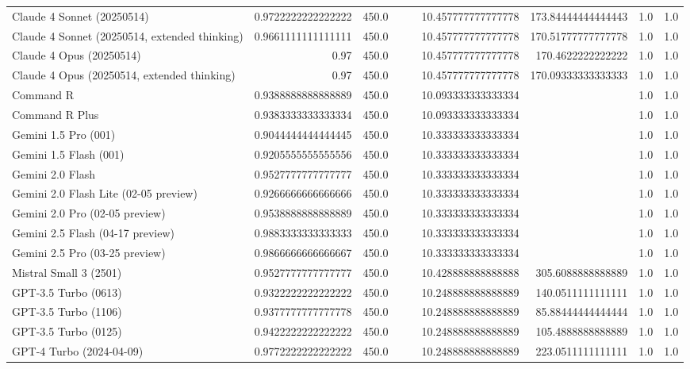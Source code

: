 \begin{table}[htp]
{\begin{tabular}{lrrrrrrrr}
Claude 4 Sonnet (20250514) & 0.9722222222222222 & 450.0 &  &  & 10.457777777777778 & 173.84444444444443 & 1.0 & 1.0 \\
Claude 4 Sonnet (20250514, extended thinking) & 0.9661111111111111 & 450.0 &  &  & 10.457777777777778 & 170.51777777777778 & 1.0 & 1.0 \\
Claude 4 Opus (20250514) & 0.97 & 450.0 &  &  & 10.457777777777778 & 170.4622222222222 & 1.0 & 1.0 \\
Claude 4 Opus (20250514, extended thinking) & 0.97 & 450.0 &  &  & 10.457777777777778 & 170.09333333333333 & 1.0 & 1.0 \\
Command R & 0.9388888888888889 & 450.0 &  &  & 10.093333333333334 &  & 1.0 & 1.0 \\
Command R Plus & 0.9383333333333334 & 450.0 &  &  & 10.093333333333334 &  & 1.0 & 1.0 \\
Gemini 1.5 Pro (001) & 0.9044444444444445 & 450.0 &  &  & 10.333333333333334 &  & 1.0 & 1.0 \\
Gemini 1.5 Flash (001) & 0.9205555555555556 & 450.0 &  &  & 10.333333333333334 &  & 1.0 & 1.0 \\
Gemini 2.0 Flash & 0.9527777777777777 & 450.0 &  &  & 10.333333333333334 &  & 1.0 & 1.0 \\
Gemini 2.0 Flash Lite (02-05 preview) & 0.9266666666666666 & 450.0 &  &  & 10.333333333333334 &  & 1.0 & 1.0 \\
Gemini 2.0 Pro (02-05 preview) & 0.9538888888888889 & 450.0 &  &  & 10.333333333333334 &  & 1.0 & 1.0 \\
Gemini 2.5 Flash (04-17 preview) & 0.9883333333333333 & 450.0 &  &  & 10.333333333333334 &  & 1.0 & 1.0 \\
Gemini 2.5 Pro (03-25 preview) & 0.9866666666666667 & 450.0 &  &  & 10.333333333333334 &  & 1.0 & 1.0 \\
Mistral Small 3 (2501) & 0.9527777777777777 & 450.0 &  &  & 10.428888888888888 & 305.6088888888889 & 1.0 & 1.0 \\
GPT-3.5 Turbo (0613) & 0.9322222222222222 & 450.0 &  &  & 10.248888888888889 & 140.0511111111111 & 1.0 & 1.0 \\
GPT-3.5 Turbo (1106) & 0.9377777777777778 & 450.0 &  &  & 10.248888888888889 & 85.88444444444444 & 1.0 & 1.0 \\
GPT-3.5 Turbo (0125) & 0.9422222222222222 & 450.0 &  &  & 10.248888888888889 & 105.4888888888889 & 1.0 & 1.0 \\
GPT-4 Turbo (2024-04-09) & 0.9772222222222222 & 450.0 &  &  & 10.248888888888889 & 223.0511111111111 & 1.0 & 1.0 \\

\end{tabular}}
\end{table}
